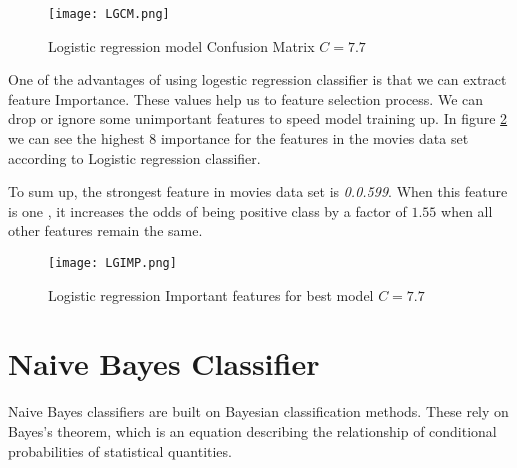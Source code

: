 \documentclass{article}
\begin{document}
\begin{figure}[H]
	\centering		
	\texttt{[image: LGCM.png]}\caption{\footnotesize Logistic regression model Confusion Matrix $C=7.7$}
	\label{fig:LGCM}	
	
\end{figure} 
One of the advantages of using logestic regression classifier is that we can extract feature Importance. These values help us to feature selection process. We can drop or ignore some unimportant features to speed model training up.
In figure \ref{fig:LGIMP} we can see the highest 8 importance for the features in the movies data set according to Logistic regression classifier.

To sum up, the strongest feature in movies data set is \textit{0.0.599}. When this feature is one , it increases the odds of being positive  class by a factor of $1.55$ when all other features remain the same. 
\begin{figure}[H]
	\centering		
	\texttt{[image: LGIMP.png]}\caption{\footnotesize Logistic regression Important features for best model  $C=7.7$}
	\label{fig:LGIMP}	
	
\end{figure} 
\section{Naive Bayes Classifier}
Naive Bayes classifiers are built on Bayesian classification methods. These rely on Bayes's theorem, which is an equation describing the relationship of conditional probabilities of statistical quantities.
\end{document}
